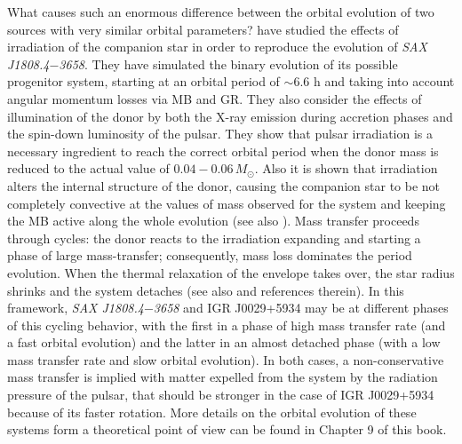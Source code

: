 \documentclass[graybox]{svmult}
\def \saxj{{\em SAX J1808.4$-$3658\xspace}}
\begin{document}
What causes such an enormous difference between the orbital evolution of two sources with very similar orbital parameters?  
\cite{Tailo2018} have studied the effects of irradiation of the companion star in order to reproduce the evolution of \saxj{}. They have simulated the binary evolution of its possible progenitor system, starting at an orbital period of $\sim 6.6$ h and taking into account angular momentum losses via MB and GR. They also consider the effects of illumination of the donor by both the X-ray emission during accretion phases and the spin-down luminosity of the pulsar. They show that pulsar irradiation is a necessary ingredient to reach the correct orbital period when the donor mass is reduced to the actual value of $0.04-0.06\, M_\odot$. Also it is shown that irradiation alters the internal structure of the donor, causing the companion star to be not completely convective at the values of mass observed for the system and keeping the MB active along the whole evolution (see also \cite{Chen2017}). Mass transfer proceeds through cycles: the donor reacts to the irradiation expanding and starting a phase of large mass-transfer; consequently, mass loss dominates the period evolution. When the thermal relaxation of the envelope takes over, the star radius shrinks and the system detaches (see also \cite{Benvenuto2017} and references therein). In this framework, \saxj{} and IGR J0029+5934 may be at different phases of this cycling behavior, with the first in a phase of high mass transfer rate (and a fast orbital evolution) and the latter in an almost detached phase (with a low mass transfer rate and slow orbital evolution). In both cases, a non-conservative mass transfer is implied with matter expelled from the system by the radiation pressure of the pulsar, that should be stronger in the case of IGR J0029+5934 because of its faster rotation. More details on the orbital evolution of these systems form a theoretical point of view can be found in Chapter 9 of this book. 
\end{document}
